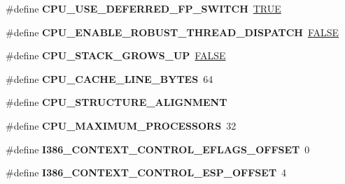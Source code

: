 \begin{DoxyCompactItemize}
\#define {\bfseries C\+P\+U\+\_\+\+U\+S\+E\+\_\+\+D\+E\+F\+E\+R\+R\+E\+D\+\_\+\+F\+P\+\_\+\+S\+W\+I\+T\+CH}~\mbox{\hyperlink{group__RTEMSScoreBaseDefs_gaa8cecfc5c5c054d2875c03e77b7be15d}{T\+R\+UE}}
\item 
\mbox{\label{group__RTEMSScoreCPUi386_ga0c634f4a6bc9236bcacafc9b6119e011}} 
\#define {\bfseries C\+P\+U\+\_\+\+E\+N\+A\+B\+L\+E\+\_\+\+R\+O\+B\+U\+S\+T\+\_\+\+T\+H\+R\+E\+A\+D\+\_\+\+D\+I\+S\+P\+A\+T\+CH}~\mbox{\hyperlink{group__RTEMSScoreBaseDefs_gaa93f0eb578d23995850d61f7d61c55c1}{F\+A\+L\+SE}}
\item 
\mbox{\label{group__RTEMSScoreCPUi386_gac40d98a563f63934a5775f1366ba1b67}} 
\#define {\bfseries C\+P\+U\+\_\+\+S\+T\+A\+C\+K\+\_\+\+G\+R\+O\+W\+S\+\_\+\+UP}~\mbox{\hyperlink{group__RTEMSScoreBaseDefs_gaa93f0eb578d23995850d61f7d61c55c1}{F\+A\+L\+SE}}
\item 
\mbox{\label{group__RTEMSScoreCPUi386_gaafa1399e268a9ae6adf6d6aad4371688}} 
\#define {\bfseries C\+P\+U\+\_\+\+C\+A\+C\+H\+E\+\_\+\+L\+I\+N\+E\+\_\+\+B\+Y\+T\+ES}~64
\item 
\mbox{\label{group__RTEMSScoreCPUi386_gacd43704c7821a2c042d212801156584e}} 
\#define {\bfseries C\+P\+U\+\_\+\+S\+T\+R\+U\+C\+T\+U\+R\+E\+\_\+\+A\+L\+I\+G\+N\+M\+E\+NT}
\item 
\mbox{\label{group__RTEMSScoreCPUi386_gadea68a7fa02909edcebee08748f94223}} 
\#define {\bfseries C\+P\+U\+\_\+\+M\+A\+X\+I\+M\+U\+M\+\_\+\+P\+R\+O\+C\+E\+S\+S\+O\+RS}~32
\item 
\mbox{\label{group__RTEMSScoreCPUi386_ga0ef5a27bf6c4eff4c14998c288ab4b65}} 
\#define {\bfseries I386\+\_\+\+C\+O\+N\+T\+E\+X\+T\+\_\+\+C\+O\+N\+T\+R\+O\+L\+\_\+\+E\+F\+L\+A\+G\+S\+\_\+\+O\+F\+F\+S\+ET}~0
\item 
\mbox{\label{group__RTEMSScoreCPUi386_ga2ebdac4fd60731f3878fdcf8c33790be}} 
\#define {\bfseries I386\+\_\+\+C\+O\+N\+T\+E\+X\+T\+\_\+\+C\+O\+N\+T\+R\+O\+L\+\_\+\+E\+S\+P\+\_\+\+O\+F\+F\+S\+ET}~4
\item 
\mbox{\label{group__RTEMSScoreCPUi386_ga306e4c0e3526f8e3f11e10f674b8e208}} 

\end{DoxyCompactItemize}
